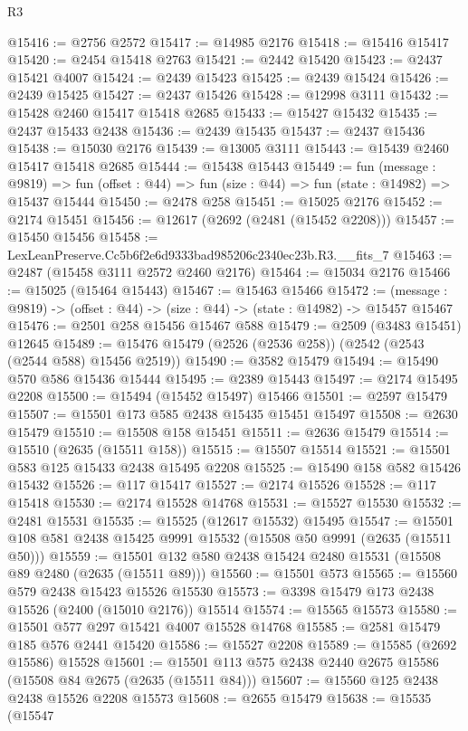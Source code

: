 \begin{lexlean}{R3}
\begin{coremodule}
@15416 := @2756 @2572
@15417 := @14985 @2176
@15418 := @15416 @15417
@15420 := @2454 @15418 @2763
@15421 := @2442 @15420
@15423 := @2437 @15421 @4007
@15424 := @2439 @15423
@15425 := @2439 @15424
@15426 := @2439 @15425
@15427 := @2437 @15426
@15428 := @12998 @3111
@15432 := @15428 @2460 @15417 @15418 @2685
@15433 := @15427 @15432
@15435 := @2437 @15433 @2438
@15436 := @2439 @15435
@15437 := @2437 @15436
@15438 := @15030 @2176
@15439 := @13005 @3111
@15443 := @15439 @2460 @15417 @15418 @2685
@15444 := @15438 @15443
@15449 := fun (message : @9819) =>
  fun (offset : @44) => fun (size : @44) => fun (state : @14982) => @15437 @15444
@15450 := @2478 @258
@15451 := @15025 @2176
@15452 := @2174 @15451
@15456 := @12617 (@2692 (@2481 (@15452 @2208)))
@15457 := @15450 @15456
@15458 := LexLeanPreserve.Cc5b6f2e6d9333bad985206c2340ec23b.R3.__fits_7
@15463 := @2487 (@15458 @3111 @2572 @2460 @2176)
@15464 := @15034 @2176
@15466 := @15025 (@15464 @15443)
@15467 := @15463 @15466
@15472 := (message : @9819) -> (offset : @44) -> (size : @44) -> (state : @14982) -> @15457 @15467
@15476 := @2501 @258 @15456 @15467 @588
@15479 := @2509 (@3483 @15451) @12645
@15489 := @15476 @15479 (@2526 (@2536 @258)) (@2542 (@2543 (@2544 @588) @15456 @2519))
@15490 := @3582 @15479
@15494 := @15490 @570 @586 @15436 @15444
@15495 := @2389 @15443
@15497 := @2174 @15495 @2208
@15500 := @15494 (@15452 @15497) @15466
@15501 := @2597 @15479
@15507 := @15501 @173 @585 @2438 @15435 @15451 @15497
@15508 := @2630 @15479
@15510 := @15508 @158 @15451
@15511 := @2636 @15479
@15514 := @15510 (@2635 (@15511 @158))
@15515 := @15507 @15514
@15521 := @15501 @583 @125 @15433 @2438 @15495 @2208
@15525 := @15490 @158 @582 @15426 @15432
@15526 := @117 @15417
@15527 := @2174 @15526
@15528 := @117 @15418
@15530 := @2174 @15528 @14768
@15531 := @15527 @15530
@15532 := @2481 @15531
@15535 := @15525 (@12617 @15532) @15495
@15547 := @15501 @108 @581 @2438 @15425 @9991 @15532 (@15508 @50 @9991 (@2635 (@15511 @50)))
@15559 := @15501 @132 @580 @2438 @15424 @2480 @15531 (@15508 @89 @2480 (@2635 (@15511 @89)))
@15560 := @15501 @573
@15565 := @15560 @579 @2438 @15423 @15526 @15530
@15573 := @3398 @15479 @173 @2438 @15526 (@2400 (@15010 @2176)) @15514
@15574 := @15565 @15573
@15580 := @15501 @577 @297 @15421 @4007 @15528 @14768
@15585 := @2581 @15479 @185 @576 @2441 @15420
@15586 := @15527 @2208
@15589 := @15585 (@2692 @15586) @15528
@15601 := @15501 @113 @575 @2438 @2440 @2675 @15586 (@15508 @84 @2675 (@2635 (@15511 @84)))
@15607 := @15560 @125 @2438 @2438 @15526 @2208 @15573
@15608 := @2655 @15479
@15638 := @15535
    (@15547

\end{coremodule}
\end{lexlean}
